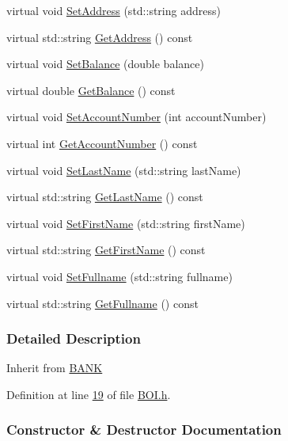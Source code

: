 \begin{DoxyCompactItemize}
virtual void \hyperlink{class_b_o_i_a00c9386c862cf2442968bf7fc30102b3}{Set\+Address} (std\+::string address)
\item 
virtual std\+::string \hyperlink{class_b_o_i_a8920e1f47b22445ba954e86012207462}{Get\+Address} () const 
\item 
virtual void \hyperlink{class_b_o_i_a416667693c10f5e4120eec97a9269348}{Set\+Balance} (double balance)
\item 
virtual double \hyperlink{class_b_o_i_a25b289dece2a1685bb9d1a9332c9be0b}{Get\+Balance} () const 
\item 
virtual void \hyperlink{class_b_o_i_affc9e7e2a36214b3790f250b7108bb65}{Set\+Account\+Number} (int account\+Number)
\item 
virtual int \hyperlink{class_b_o_i_a5b18e1538f3d37835234946cdf9f240f}{Get\+Account\+Number} () const 
\item 
virtual void \hyperlink{class_b_o_i_a663906e9a59ffa970fb928746c01e8af}{Set\+Last\+Name} (std\+::string last\+Name)
\item 
virtual std\+::string \hyperlink{class_b_o_i_a37828f3fa4a32f522966e2cad90eaab2}{Get\+Last\+Name} () const 
\item 
virtual void \hyperlink{class_b_o_i_ae9042f87be085c2cec799981c30d7d19}{Set\+First\+Name} (std\+::string first\+Name)
\item 
virtual std\+::string \hyperlink{class_b_o_i_ab4b9d50c6008a666aa4382def580e7d1}{Get\+First\+Name} () const 
\item 
virtual void \hyperlink{class_b_o_i_a93091f16610f1a1474aea31fd5f81ffd}{Set\+Fullname} (std\+::string fullname)
\item 
virtual std\+::string \hyperlink{class_b_o_i_af56446a377068cd65526e40e8b31b878}{Get\+Fullname} () const 
\end{DoxyCompactItemize}


\subsubsection{Detailed Description}
Inherit from \hyperlink{class_b_a_n_k}{B\+A\+NK} 

Definition at line \hyperlink{_b_o_i_8h_source_l00019}{19} of file \hyperlink{_b_o_i_8h_source}{B\+O\+I.\+h}.



\subsubsection{Constructor \& Destructor Documentation}
